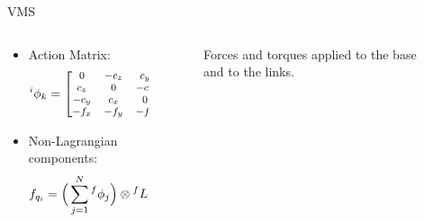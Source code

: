 \begin{frame}{VMS}
    \begin{columns}
        \begin{column}{0.5\textwidth}
            \begin{itemize}
                \item Action Matrix:
                \begin{equation}
                    \begin{footnotesize}
                    \prescript{i}{}{\phi}_k=\begin{bmatrix}
                      0&-c_z&c_y&f_x\\
                      c_z&0&-c_x&f_y\\
                      -c_y&c_x&0&f_z\\
                      -f_x&-f_y&-f_z&0
                    \end{bmatrix}
                    \end{footnotesize}
                  \end{equation}
                \item Non-Lagrangian components:
                \begin{equation}
                    f_{q_i}=\Big(\sum_{j=1}^N\prescript{f}{}{\phi_j}\Big)\otimes \prescript{f}{}{L_{q_i}}
                  \end{equation}
            \end{itemize}
        \end{column}
        \begin{column}{0.5\textwidth}
            \begin{figure}
                \centering
                \scalebox{0.55}{}
                \caption{Forces and torques applied to the base and to the links.}
              \end{figure}
        \end{column}
    \end{columns}
    \end{frame}

